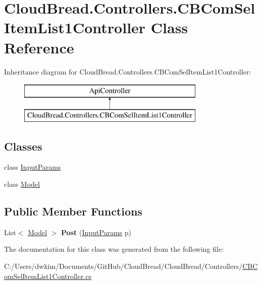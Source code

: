 \hypertarget{class_cloud_bread_1_1_controllers_1_1_c_b_com_sel_item_list1_controller}{}\section{Cloud\+Bread.\+Controllers.\+C\+B\+Com\+Sel\+Item\+List1\+Controller Class Reference}
\label{class_cloud_bread_1_1_controllers_1_1_c_b_com_sel_item_list1_controller}
Inheritance diagram for Cloud\+Bread.\+Controllers.\+C\+B\+Com\+Sel\+Item\+List1\+Controller\+:\begin{figure}[H]
\begin{center}
\leavevmode
\includegraphics[height=2.000000cm]{class_cloud_bread_1_1_controllers_1_1_c_b_com_sel_item_list1_controller}
\end{center}
\end{figure}
\subsection*{Classes}
\begin{DoxyCompactItemize}
\item 
class \hyperlink{class_cloud_bread_1_1_controllers_1_1_c_b_com_sel_item_list1_controller_1_1_input_params}{Input\+Params}
\item 
class \hyperlink{class_cloud_bread_1_1_controllers_1_1_c_b_com_sel_item_list1_controller_1_1_model}{Model}
\end{DoxyCompactItemize}
\subsection*{Public Member Functions}
\begin{DoxyCompactItemize}
\item 
List$<$ \hyperlink{class_cloud_bread_1_1_controllers_1_1_c_b_com_sel_item_list1_controller_1_1_model}{Model} $>$ {\bfseries Post} (\hyperlink{class_cloud_bread_1_1_controllers_1_1_c_b_com_sel_item_list1_controller_1_1_input_params}{Input\+Params} p)\hypertarget{class_cloud_bread_1_1_controllers_1_1_c_b_com_sel_item_list1_controller_af380b95d0be1eecc1e870c9980be4e94}{}\label{class_cloud_bread_1_1_controllers_1_1_c_b_com_sel_item_list1_controller_af380b95d0be1eecc1e870c9980be4e94}

\end{DoxyCompactItemize}


The documentation for this class was generated from the following file\+:\begin{DoxyCompactItemize}
\item 
C\+:/\+Users/dwkim/\+Documents/\+Git\+Hub/\+Cloud\+Bread/\+Cloud\+Bread/\+Controllers/\hyperlink{_c_b_com_sel_item_list1_controller_8cs}{C\+B\+Com\+Sel\+Item\+List1\+Controller.\+cs}\end{DoxyCompactItemize}

